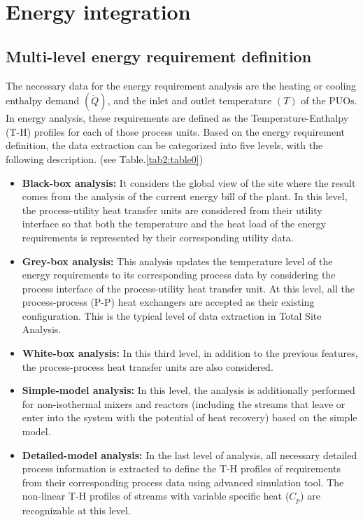 \section{Energy integration}





\subsection{Multi-level energy requirement definition}
\label{subsec:Multi-layer}
The necessary data for the energy requirement analysis are the heating or cooling enthalpy demand $(\dot{Q})$, and the inlet and outlet temperature $ (T) $ of the PUOs. In energy analysis, these requirements are defined as the Temperature-Enthalpy (T-H) profiles for each of those process units. Based on the energy requirement definition, the data extraction can be categorized into five levels, with the following description. (see Table.\ref{tab2:table0})

\begin{itemize}
	\item \textbf{Black-box analysis:}
        It considers the global view of the site where the result comes from the analysis of the current energy bill of the plant. In this level, the process-utility heat transfer units are considered from their utility interface so that both the temperature and the heat load of the energy requirements is represented by their corresponding utility data.
    \item \textbf{Grey-box analysis:}
        This analysis updates the temperature level of the energy requirements to its corresponding process data by considering the process interface of the process-utility heat transfer unit. At this level, all the process-process (P-P) heat exchangers are accepted as their existing configuration. This is the typical level of data extraction in Total Site Analysis.
    \item \textbf{White-box analysis:}
         In this third level, in addition to the previous features, the process-process heat transfer units are also considered. 
    \item \textbf{Simple-model analysis:}
    	In this level, the analysis is additionally performed for non-isothermal mixers and reactors (including the streams that leave or enter into the system with the potential of heat recovery) based on the simple model. 
    \item \textbf{Detailed-model analysis:}
    	In the last level of analysis, all necessary detailed process information is extracted to define the T-H profiles of requirements from their corresponding process data using advanced simulation tool. The non-linear T-H profiles of streams with variable specific heat ($C_{p}$) are recognizable at this level.
\end{itemize}



